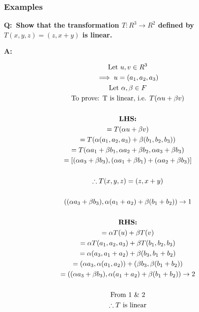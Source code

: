 \documentclass[english,course,fleqn]{lecture}
\newenvironment{qanda}{\setlength{\parindent}{0pt}}{\bigskip}
\newcommand{\Q}{\bigskip\bfseries Q:\ }
\newcommand{\A}{\par\textbf{A:} \normalfont}
\begin{document}
\subsubsection{Examples}

\begin{qanda}

	\Q Show that the transformation $T:R^{3} \rightarrow R^{2}$ defined by $T(x,y,z) = (z,x+y)$ is linear.

	\A

	\begin{gather*}
		\text{Let }u,v \in R^{3}\\
		\implies u = (a_{1}, a_{2}, a_{3})\\
		\text{Let }\alpha,\beta \in F\\
		\text{To prove: T is linear, i.e. }T(\alpha u + \beta v)\\\\
		\text{\textbf{LHS:}}\\
		= T(\alpha u + \beta v)\\
		= T(\alpha(a_{1}, a_{2}, a_{3}) + \beta(b_{1}, b_{2}, b_{3}))\\
		= T(\alpha a_{1} + \beta b_{1}, \alpha a_{2} + \beta b_{2}, \alpha a_{3} + \beta b_{3})\\
		= [(\alpha a_{3} + \beta b_{3}), (\alpha a_{1} + \beta b_{1}) + (\alpha a_{2} + \beta b_{3})]\\
		\\
		\therefore T(x,y,z) = (z, x + y)\\
		\\
		((\alpha a_{3} + \beta b_{3}), \alpha (a_{1} + a_{2}) + \beta(b_{1} + b_{2})) \rightarrow 1\\
		\\
		\text{\textbf{RHS:}}\\
		= \alpha T(u) + \beta T (v)\\
		= \alpha T(a_{1}, a_{2}, a_{3}) + \beta T(b_{1}, b_{2}, b_{3})\\
		= \alpha(a_{3}, a_{1} + a_{2}) + \beta (b_{3}, b_{1} + b_{2})\\
		= (\alpha a_{3}, \alpha (a_{1}, a_{2})) + (\beta b_{3}, \beta (b_{1} + b_{2}))\\
		= ((\alpha a_{3} + \beta b_{3}), \alpha (a_{1} + a_{2}) + \beta (b_{1} + b_{2})) \rightarrow 2\\
		\\
		\text{From 1 \& 2}\\
		\therefore T \text{ is linear}
	\end{gather*}


\end{qanda}
\end{document}
